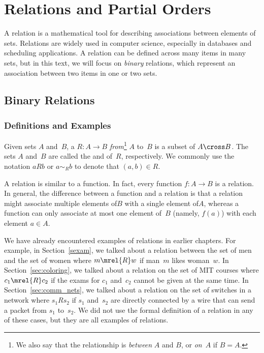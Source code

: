 \chapter{Relations and Partial Orders}\label{chap:partial_orders}

A relation is a mathematical tool for describing associations between
elements of sets.  Relations are widely used in computer science,
especially in databases and scheduling applications.  A relation can
be defined across many items in many sets, but in this text, we will
focus on \emph{binary} relations, which represent an association
between two items in one or two sets.

\section{Binary Relations}

\subsection{Definitions and Examples}

\begin{definition}\label{def:binary_relation}
Given sets $A$ and~$B$, a  $R: A \to B$
\emph{from}\footnote{We also say that the relationship is
  \emph{between} $A$ and $B$, or \emph{on}~$A$ if $B = A$.} $A$ to~$B$
is a subset of $A \cross B$.  The sets $A$ and~$B$ are called the
 and  of~$R$, respectively.  We commonly
use the notation $aRb$ or $a \sim_R b$ to denote that $(a, b) \in R$.
\end{definition}

A relation is similar to a function.  In fact, every function $f: A
\to B$ is a relation.  In general, the difference between a function
and a relation is that a relation might associate multiple elements
of$B$ with a single element of$A$, whereas a function can only
associate at most one element of~$B$ (namely, $f(a)$) with each
element $a \in A$.

We have already encountered examples of relations in earlier chapters.
For example, in Section~\ref{sexam}, we talked about a relation between
the set of men and the set of women where $m\mrel{R}w$ if man~$m$ likes
woman~$w$.  In Section~\ref{sec:coloring}, we talked about a relation on
the set of MIT courses where $c_1 \mrel{R} c_2$ if the exams for $c_1$ and~$c_2$
cannot be given at the same time.  In Section~\ref{sec:comm_nets}, we
talked about a relation on the set of switches in a network where $s_1 R
s_2$ if $s_1$ and~$s_2$ are directly connected by a wire that can send a
packet from $s_1$ to~$s_2$.  We did not use the formal definition of a
relation in any of these cases, but they are all examples of relations.

